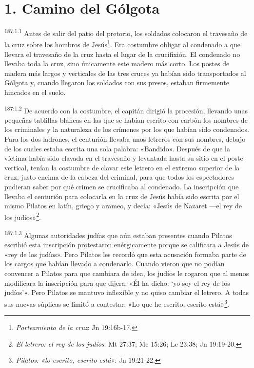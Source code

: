 \section*{1. Camino del Gólgota}
\par 
\textsuperscript{187:1.1} Antes de salir del patio del pretorio, los soldados colocaron el travesaño de la cruz sobre los hombros de Jesús\footnote{\textit{Porteamiento de la cruz}: Jn 19:16b-17.}. Era costumbre obligar al condenado a que llevara el travesaño de la cruz hasta el lugar de la crucifixión. El condenado no llevaba toda la cruz, sino únicamente este madero más corto. Los postes de madera más largos y verticales de las tres cruces ya habían sido transportados al Gólgota y, cuando llegaron los soldados con sus presos, estaban firmemente hincados en el suelo.

\par 
\textsuperscript{187:1.2} De acuerdo con la costumbre, el capitán dirigió la procesión, llevando unas pequeñas tablillas blancas en las que se habían escrito con carbón los nombres de los criminales y la naturaleza de los crímenes por los que habían sido condenados. Para los dos ladrones, el centurión llevaba unos letreros con sus nombres, debajo de los cuales estaba escrita una sola palabra: «Bandido». Después de que la víctima había sido clavada en el travesaño y levantada hasta su sitio en el poste vertical, tenían la costumbre de clavar este letrero en el extremo superior de la cruz, justo encima de la cabeza del criminal, para que todos los espectadores pudieran saber por qué crimen se crucificaba al condenado. La inscripción que llevaba el centurión para colocarla en la cruz de Jesús había sido escrita por el mismo Pilatos en latín, griego y arameo, y decía: «Jesús de Nazaret ---el rey de los judíos»\footnote{\textit{El letrero: el rey de los judíos}: Mt 27:37; Mc 15:26; Lc 23:38; Jn 19:19-20.}.

\par 
\textsuperscript{187:1.3} Algunas autoridades judías que aún estaban presentes cuando Pilatos escribió esta inscripción protestaron enérgicamente porque se calificara a Jesús de «rey de los judíos». Pero Pilatos les recordó que esta acusación formaba parte de los cargos que habían llevado a condenarlo. Cuando vieron que no podían convencer a Pilatos para que cambiara de idea, los judíos le rogaron que al menos modificara la inscripción para que dijera: «Él ha dicho: `yo soy el rey de los judíos'». Pero Pilatos se mantuvo inflexible y no quiso cambiar el letrero. A todas sus nuevas súplicas se limitó a contestar: «Lo que he escrito, escrito está»\footnote{\textit{Pilatos: «lo escrito, escrito está»}: Jn 19:21-22.}.

